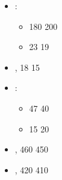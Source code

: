 \begin{itemize}
\item \necropolisguard{}\spacebeforecolon{}:
\begin{itemize}
\item \basecost{} 180 \costup{} 200
\item \extramodel{} 23 \costdown{} 19
\end{itemize}
\item \shabtis{}, \halberd{} 18 \costdown{} 15
\item \scarabswarms{}\spacebeforecolon{}:
\begin{itemize}
\item \extramodel{} 47 \costdown{} 40
\item \undergroundambush{} 15 \costup{} 20
\end{itemize}
\item \dreadsphinx{}, \basecost{} 460 \costdown{} 450
\item \colossus{}, \basecost{} 420 \costdown{} 410
\end{itemize}
